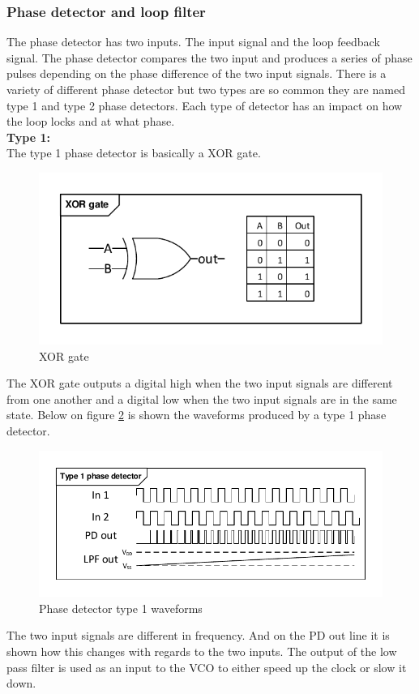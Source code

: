 \subsubsection{Phase detector and loop filter}
The phase detector has two inputs. The input signal and the loop feedback signal. The phase detector compares the two input and produces a series of phase pulses depending on the phase difference of the two input signals. There is a variety of different phase detector but two types are so common they are named type 1 and type 2 phase detectors. Each type of detector has an impact on how the loop locks and at what phase.
\\ \textbf{Type 1:}\\
The type 1 phase detector is basically a XOR gate. 
\begin{figure}[H]
	\centering
	\includegraphics[width=.6\textwidth]{billeder/10technologystudies/XORgate}
	\caption{XOR gate}
	\label{fig:XOR}
\end{figure}
The XOR gate outputs a digital high when the two input signals are different from one another and a digital low when the two input signals are in the same state. Below on figure \ref{fig:pd1_waveforms} is shown the waveforms produced by a type 1 phase detector.
\begin{figure}[H]
	\centering
	\includegraphics[width=.8\textwidth]{billeder/10technologystudies/PD1_waveforms}
	\caption{Phase detector type 1 waveforms}
	\label{fig:pd1_waveforms}
\end{figure}
The two input signals are different in frequency. And on the PD out line it is shown how this changes with regards to the two inputs.  The output of the low pass filter is used as an input to the VCO to either speed up the clock or slow it down.\\
